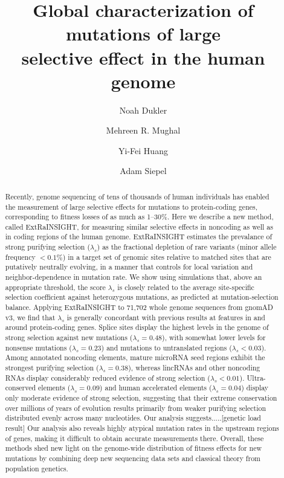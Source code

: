 \documentclass[11pt]{article}
\title{Global characterization of mutations of large \\
  selective effect in the human genome}
\author[1]{Noah Dukler}
\author[1]{Mehreen R. Mughal}
\author[2]{Yi-Fei Huang}
\author[1]{Adam Siepel}
\affil[1]{Simons Center for Quantitative Biology, Cold Spring Harbor Laboratory, Cold Spring Harbor, NY}
\affil[2]{Department of Biology and Huck Institutes of the Life Sciences, University Park, PA}
\date{}
\begin{document}
\maketitle


\begin{abstract}
  Recently, genome sequencing of tens of thousands of human individuals has enabled the measurement of large selective effects for mutations to protein-coding genes, corresponding to fitness losses of as much as 1--30\%.  Here we describe a new method, called ExtRaINSIGHT, for measuring similar selective effects in
  noncoding as well as in coding regions of the human genome.  ExtRaINSIGHT estimates the prevalance of strong purifying selection ($\lambda_s$) as the fractional depletion of rare variants (minor allele frequency $<0.1$\%) in a target set of genomic sites relative to matched sites that are putatively neutrally evolving, in a manner that controls for local variation and neighbor-dependence in mutation rate.
%  
We show using simulations that, above an appropriate threshold, the score $\lambda_s$ is closely related to the average site-specific selection coefficient against heterozygous mutations, as predicted at mutation-selection balance.
 Applying ExtRaINSIGHT to 71,702 whole genome sequences from gnomAD v3,
we find that $\lambda_s$ is generally concordant with previous results at features in and around protein-coding genes.  Splice sites display the highest levels in the genome of strong selection against new mutations ($\lambda_s=0.48$), with somewhat lower levels for nonsense mutations ($\lambda_s=0.23$) and mutations to untranslated regions ($\lambda_s< 0.03$).
Among annotated noncoding elements, 
mature microRNA seed regions exhibit the strongest purifying selection ($\lambda_s =  0.38$),
  whereas lincRNAs and other noncoding RNAs display considerably reduced evidence of strong selection ($\lambda_s < 0.01$).
 Ultra-conserved elements ($\lambda_s = 0.09$) and human accelerated elements ($\lambda_s = 0.04$) display only moderate evidence of strong selection, suggesting that  
  their extreme conservation over millions of years of evolution results primarily from weaker purifying selection distributed evenly across many nucleotides.
  Our analysis suggests.....[genetic load result]
Our analysis also reveals highly atypical mutation rates in the upstream regions of genes, making it difficult to obtain accurate measurements there.  Overall, these methods shed new light on the genome-wide distribution of fitness effects for new mutations by combining deep new sequencing data sets and classical theory from population genetics.


\end{abstract}
\end{document}
